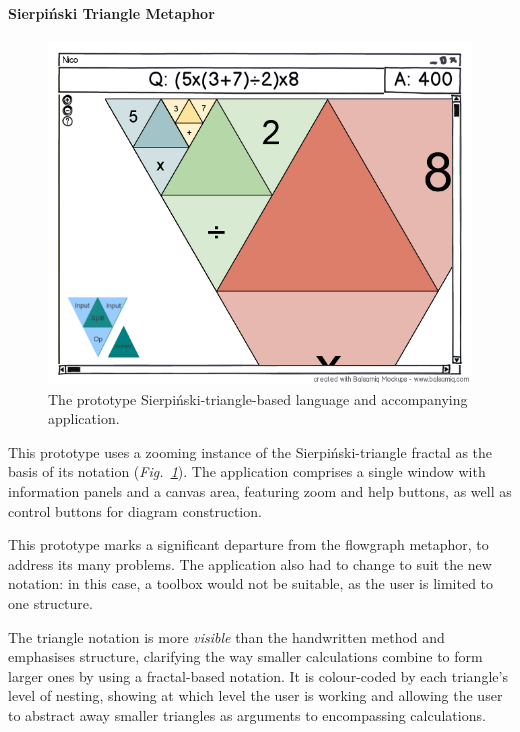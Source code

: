 \documentclass[12pt,twoside,notitlepage,xetex]{report}
\begin{document}
\newpage
\paragraph{Sierpiński Triangle Metaphor}\hfill

\begin{figure}[H]
\begin{center}
\includegraphics[width=\textwidth]{figs/mockups/sierp/sierp_mockup_full.png}
\caption{The prototype Sierpiński-triangle-based language and accompanying application.}
\label{fig:ProtoTri}
\end{center}
\end{figure}

This prototype uses a zooming instance of the Sierpiński-triangle fractal as the basis of its notation (\emph{Fig.~\ref{fig:ProtoTri}}).  The application comprises a single window with information panels and a canvas area, featuring zoom and help buttons, as well as control buttons for diagram construction.

This prototype marks a significant departure from the flowgraph metaphor, to address its many problems.  The application also had to change to suit the new notation: in this case, a toolbox would not be suitable, as the user is limited to one structure.

The triangle notation is more \emph{visible} than the handwritten method and emphasises structure, clarifying the way smaller calculations combine to form larger ones by using a fractal-based notation.  It is colour-coded by each triangle's level of nesting, showing at which level the user is working and allowing the user to abstract away smaller triangles as arguments to encompassing calculations.
\end{document}
